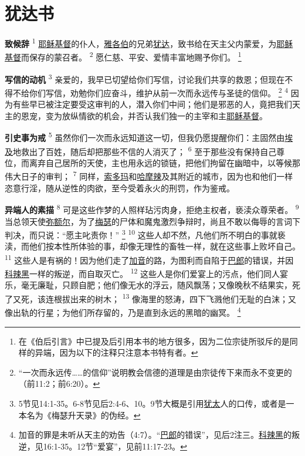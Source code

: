 \chapter*{犹达书}


\textbf{致候辞\quad}
\textsuperscript{1}
\uline{耶稣}\uline{基督}的仆人，\uline{雅各伯}的兄弟\uline{犹达}，致书给在天主父内蒙爱，为\uline{耶稣}\uline{基督}而保存的蒙召者。
\textsuperscript{2}
愿仁慈、平安、爱情丰富地赐予你们。
\renewcommand\thefootnote{\ding{\numexpr171+\value{footnote}}}
\footnote{在《伯后引言》中已提及后引用本书的地方很多，因为二位宗徒所驳斥的是同样的异端，因为以下的注释只注意本书特有者。}

\textbf{写信的动机\quad}
\textsuperscript{3}
亲爱的，我早已切望给你们写信，讨论我们共享的救恩；但现在不得不给你们写信，劝勉你们应奋斗，维护从前一次而永远传与圣徒的信仰。
\footnote{“一次而永远传……的信仰”说明教会信德的道理是由宗徒传下来而永不变更的（前11:2；前6:20）。}
\textsuperscript{4}
因为有些早已被注定要受这审判的人，潜入你们中间；他们是邪恶的人，竟把我们天主的恩宠，变为放纵情欲的机会，并否认我们独一的主宰和主\uline{耶稣}\uline{基督}。

\textbf{引史事为戒\quad}
\textsuperscript{5}
虽然你们一次而永远知道这一切，但我仍愿提醒你们：主固然由\uline{埃及}地救出了百姓，随后却把那些不信的人消灭了；
\textsuperscript{6}
至于那些没有保持自己尊位，而离弃自己居所的天使，主也用永远的锁链，把他们拘留在幽暗中，以等候那伟大日子的审判；
\textsuperscript{7}
同样，\uline{索多玛}和\uline{哈摩辣}及其附近的城市，因为也和他们一样恣意行淫，随从逆性的肉欲，至今受着永火的刑罚，作为鉴戒。

\textbf{异端人的素描\quad}
\textsuperscript{8}
可是这些作梦的人照样玷污肉身，拒绝主权者，亵渎众尊荣者。
\textsuperscript{9}
当总领天使\uline{弥额尔}，为了\uline{梅瑟}的尸体和魔鬼激烈争辩时，尚且不敢以侮辱的言词下判决，而只说：“愿主叱责你！”
\footnote{5节见14:1-35。6-8节见后2:4-6、10。9节大概是引用\uline{犹太}人的口传，或者是一本名为《梅瑟升天录》的伪经。}
\textsuperscript{10}
这些人却不然，凡他们所不明白的事就亵渎，而他们按本性所体验的事，却像无理性的畜牲一样，就在这些事上败坏自己。
\textsuperscript{11}
这些人是有祸的！因为他们走了\uline{加音}的路，为图利而自陷于\uline{巴郎}的错误，并因\uline{科辣黑}一样的叛逆，而自取灭亡。
\textsuperscript{12}
这些人是你们爱宴上的污点，他们同人宴乐，毫无廉耻，只顾自肥；他们像无水的浮云，随风飘荡；又像晚秋不结果实，死了又死，该连根拔出来的树木；
\textsuperscript{13}
像海里的怒涛，四下飞溅他们无耻的白沫；又像出轨的行星；为他们所存留的，乃是直到永远的黑暗的幽冥。
\footnote{加音的罪是未听从天主的劝告（4:7）。“\uline{巴郎}的错误”，见后2注三。\uline{科辣黑}的叛逆，见16:1-35。12节“爱宴”，见前11:17-23。}

